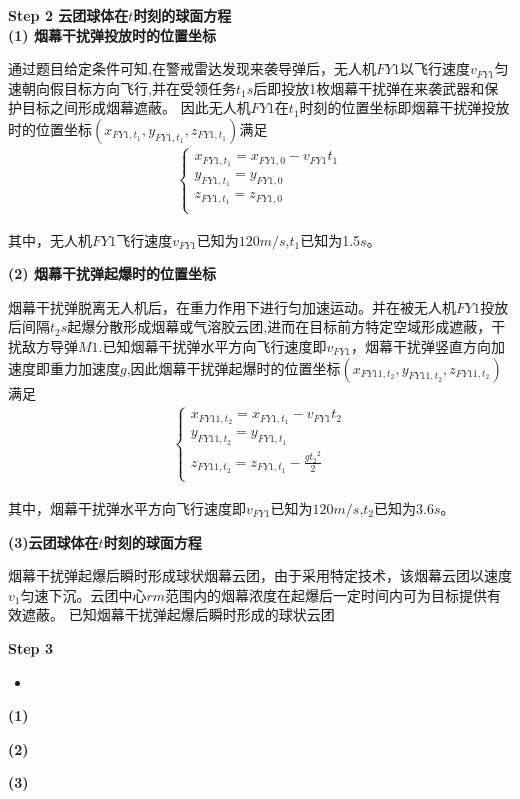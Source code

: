 \documentclass[../main.tex]{subfiles}
\begin{document}
\noindent\textbf{Step 2 云团球体在$t$时刻的球面方程}
\\
\noindent \textbf{(1) 烟幕干扰弹投放时的位置坐标}
\par 通过题目给定条件可知,在警戒雷达发现来袭导弹后，无人机\( FY1 \)以飞行速度\( v_{FY1} \)匀速朝向假目标方向飞行,并在受领任务$t_1s$后即投放1枚烟幕干扰弹在来袭武器和保护目标之间形成烟幕遮蔽。
因此无人机$FY1$在$t_1$时刻的位置坐标即烟幕干扰弹投放时的位置坐标$(x_{FY1,t_1}, y_{FY1,{t_1}}, z_{FY1,{t_1}})$满足
\begin{align}\label{1.8}
    \left\{ \begin{array}{l}
	x_{FY1,{t_1}}=x_{FY1,0}-v_{FY1}{t_1}\\
	y_{FY1,{t_1}}=y_{FY1,0}\\
	z_{FY1,{t_1}}=z_{FY1,0}\\
\end{array} \right. 
\end{align}
\par 其中，无人机$FY1$飞行速度\( v_{FY1} \)已知为$120m/s$,$t_1$已知为1.5$s$。


\noindent\textbf{(2) 烟幕干扰弹起爆时的位置坐标}
\par 烟幕干扰弹脱离无人机后，在重力作用下进行匀加速运动。并在被无人机$FY1$投放后间隔$t_2s$起爆分散形成烟幕或气溶胶云团,进而在目标前方特定空域形成遮蔽，干扰敌方导弹$M1$.已知烟幕干扰弹水平方向飞行速度即\( v_{FY1} \)，烟幕干扰弹竖直方向加速度即重力加速度$g$,因此烟幕干扰弹起爆时的位置坐标$\left( x_{FY11,t_2},y_{FY11,t_2},z_{FY11,t_2} \right)$满足
\begin{align}\label{1.9}
\left\{ \begin{array}{l}
	x_{FY11,{t_2}}=x_{FY1,t_1}-v_{FY1}{t_2} \\
	y_{FY11,{t_2}}=y_{FY1,t_1}\\
	z_{FY11,{t_2}}=z_{FY1,t_1}-\frac{g{t_2} ^2}{2}\\
\end{array} \right. 
\end{align}
\par 其中，烟幕干扰弹水平方向飞行速度即\( v_{FY1} \)已知为$120m/s$,$t_2$已知为3.6$s$。


\noindent \textbf{(3)云团球体在$t$时刻的球面方程 }
\par 烟幕干扰弹起爆后瞬时形成球状烟幕云团，由于采用特定技术，该烟幕云团以速度$v_1$匀速下沉。云团中心$rm$范围内的烟幕浓度在起爆后一定时间内可为目标提供有效遮蔽。
已知烟幕干扰弹起爆后瞬时形成的球状云团


\textbf{Step 3 }
\begin{itemize}
\item \textbf{}
\end{itemize}
\par \textbf{(1) }
\par \textbf{(2) }
\par \textbf{(3) }
\end{document}
